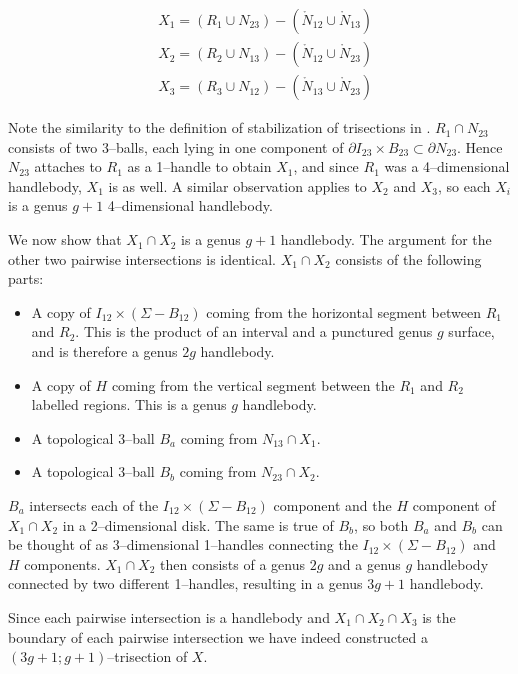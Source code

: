 \documentclass[12pt]{amsart}
\newcommand{\del}{\partial }
\theoremstyle{definition}
\theoremstyle{remark}
\begin{document}
\begin{align*}
&X_1 = (R_1 \cup N_{23}) - (\mathring N_{12} \cup \mathring N_{13}) \\
&X_2 = (R_2 \cup N_{13}) - (\mathring N_{12} \cup \mathring N_{23}) \\
&X_3 = (R_3 \cup N_{12}) - (\mathring N_{13} \cup \mathring N_{23})
\end{align*}

Note the similarity to the definition of stabilization of trisections in \cite{GayKirby1}.
$R_1 \cap N_{23}$ consists of two 3--balls, each lying in one component of $\del I_{23} \times B_{23} \subset \del N_{23}$.
Hence $N_{23}$ attaches to $R_1$ as a 1--handle to obtain $X_1$, and since $R_1$ was a 4--dimensional handlebody, $X_1$ is as well.
A similar observation applies to $X_2$ and $X_3$, so each $X_i$ is a genus $g+1$ 4--dimensional handlebody.

We now show that $X_1 \cap X_2$ is a genus $g+1$ handlebody.
The argument for the other two pairwise intersections is identical.
$X_1 \cap X_2$ consists of the following parts:

\begin{itemize}
\item A copy of $I_{12} \times (\Sigma - B_{12})$ coming from the horizontal segment between $R_1$ and $R_2$.
This is the product of an interval and a punctured genus $g$ surface, and is therefore a genus $2g$ handlebody.

\item A copy of $H$ coming from the vertical segment between the $R_1$ and $R_2$ labelled regions.
This is a genus $g$ handlebody.
\item A topological 3--ball $B_a$ coming from $N_{13} \cap X_1$.
\item A topological 3--ball $B_b$ coming from $N_{23} \cap X_2$.
\end{itemize}

$B_a$ intersects each of the $I_{12} \times (\Sigma - B_{12})$ component and the $H$ component of $X_1 \cap X_2$ in a 2--dimensional disk.
The same is true of $B_b$, so both $B_a$ and $B_b$ can be thought of as 3--dimensional 1--handles connecting the $I_{12} \times (\Sigma - B_{12})$ and $H$ components.
$X_1 \cap X_2$ then consists of a genus $2g$ and a genus $g$ handlebody connected by two different 1--handles, resulting in a genus $3g+1$ handlebody.


Since each pairwise intersection is a handlebody and $X_1 \cap X_2 \cap X_3$ is the boundary of each pairwise intersection we have indeed constructed a $(3g+1;g+1)$--trisection of $X$.
\end{document}
